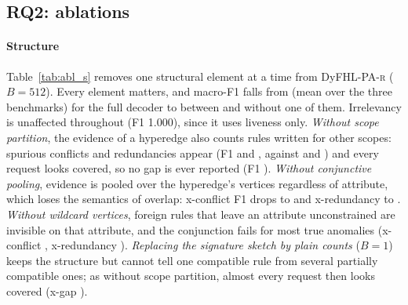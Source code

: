 \documentclass[preprint,12pt]{elsarticle}
\theoremstyle{definition}
\newcommand{\name}{DyFHL-PA\xspace}
\newcommand{\R}{\textsc{r}}
\begin{document}
\begin{table}[t]
\caption{Cross-domain anomaly detection without pooling policies: F1 per task, macro-F1 and macro-AUPRC (mean $\pm$ std over five seeds). All methods use $B=512$ where applicable; the last row of each block uses $B=4096$. Best mean per column and benchmark in bold. Tasks without positive instances in a run are excluded from that run's averages. $^\dagger$Trained on 20\% of the oracle labels, tested on the remaining 80\%.}
\label{tab:main}
\centering\scriptsize
\setlength{\tabcolsep}{3pt}
\end{table}

\subsection{RQ2: ablations}
\label{sec:ablation}
\paragraph{Structure} Table~\ref{tab:abl_s} removes one structural element at a time from \name-\R{} ($B=512$). Every element matters, and macro-F1 falls from \ablstrfull{} (mean over the three benchmarks) for the full decoder to between \ablstrscopepartition{} and \ablstrconjunctivepoo{} without one of them. Irrelevancy is unaffected throughout (F1 1.000), since it uses liveness only. \emph{Without scope partition}, the evidence of a hyperedge also counts rules written for other scopes: spurious conflicts and redundancies appear (F1 \ablstrscopepartitioncon{} and \ablstrscopepartitionred, against \ablstrfullcon{} and \ablstrfullred) and every request looks covered, so no gap is ever reported (F1 \ablstrscopepartitiongap). \emph{Without conjunctive pooling}, evidence is pooled over the hyperedge's vertices regardless of attribute, which loses the semantics of overlap: x-conflict F1 drops to \ablstrconjunctivepoocon{} and x-redundancy to \ablstrconjunctivepoored. \emph{Without wildcard vertices}, foreign rules that leave an attribute unconstrained are invisible on that attribute, and the conjunction fails for most true anomalies (x-conflict \ablstrwildcardverticcon, x-redundancy \ablstrwildcardverticred). \emph{Replacing the signature sketch by plain counts} ($B=1$) keeps the structure but cannot tell one compatible rule from several partially compatible ones; as without scope partition, almost every request then looks covered (x-gap \ablstrsignaturesketcgap).
\end{document}
